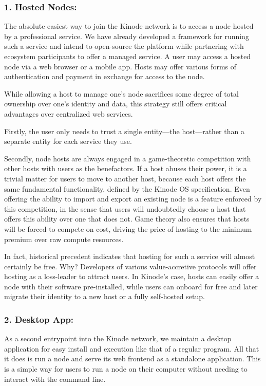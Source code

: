 \documentclass[runningheads]{llncs}
\begin{document}
\subsubsection{1. Hosted Nodes:}

The absolute easiest way to join the Kinode network is to access a node hosted by a professional service.
We have already developed a framework for running such a service and intend to open-source the platform while partnering with ecosystem participants to offer a managed service.
A user may access a hosted node via a web browser or a mobile app.
Hosts may offer various forms of authentication and payment in exchange for access to the node.

While allowing a host to manage one's node sacrifices some degree of total ownership over one's identity and data, this strategy still offers critical advantages over centralized web services.

Firstly, the user only needs to trust a single entity—the host—rather than a separate entity for each service they use.

Secondly, node hosts are always engaged in a game-theoretic competition with other hosts with users as the benefactors.
If a host abuses their power, it is a trivial matter for users to move to another host, because each host offers the same fundamental functionality, defined by the Kinode OS specification.
Even offering the ability to import and export an existing node is a feature enforced by this competition, in the sense that users will undoubtedly choose a host that offers this ability over one that does not.
Game theory also ensures that hosts will be forced to compete on cost, driving the price of hosting to the minimum premium over raw compute resources.

In fact, historical precedent indicates that hosting for such a service will almost certainly be free.
Why?
Developers of various value-accretive protocols will offer hosting as a loss-leader to attract users.
In Kinode's case, hosts can easily offer a node with their software pre-installed, while users can onboard for free and later migrate their identity to a new host or a fully self-hosted setup.

\subsubsection{2. Desktop App:}

As a second entrypoint into the Kinode network, we maintain a desktop application for easy install and execution like that of a regular program.
All that it does is run a node and serve its web frontend as a standalone application.
This is a simple way for users to run a node on their computer without needing to interact with the command line.
\end{document}
